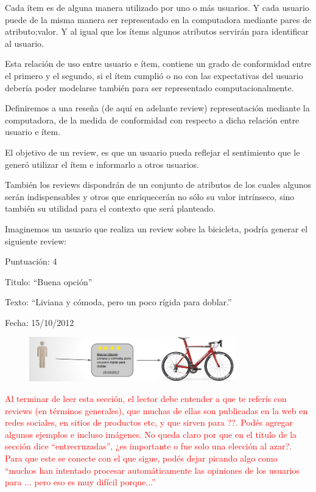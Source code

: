 Cada ítem es de alguna manera utilizado por uno o más usuarios. Y cada usuario puede de la misma manera ser representado en la computadora mediante pares de atributo;valor. Y al igual que los ítems algunos atributos servirán para identificar al usuario. 

Esta relación de uso entre usuario e ítem, contiene un grado de conformidad entre el primero y el segundo, si el ítem cumplió o no con las expectativas del usuario debería poder modelarse también para ser representado computacionalmente.

Definiremos a una reseña (de aquí en adelante review) representación mediante la computadora, de la medida de conformidad con respecto a dicha relación entre usuario e ítem. 

El objetivo de un review, es que un usuario pueda reflejar el sentimiento que le generó utilizar el ítem e informarlo a otros usuarios. 

También los reviews dispondrán de un conjunto de atributos de los cuales algunos serán indispensables y otros que enriquecerán no sólo su valor intrínseco, sino también su utilidad para el contexto que será planteado.

Imaginemos un usuario que realiza un review sobre la bicicleta, podría generar el siguiente review:

Puntuación: 4 

Titulo: ``Buena opción''

Texto: ``Liviana y cómoda, pero un poco rígida para doblar.''

Fecha: 15/10/2012

\begin{figure}
    \centering
    \includegraphics[width=0.8\textwidth,natwidth=610,natheight=642]{biciReview.png}
\end{figure}
\begin{framed}
\textcolor{red}{Al terminar de leer esta sección, el lector debe entender a que te referís con reviews (en términos generales), que muchas de ellas son publicadas en la web en redes sociales, en sitios de productos etc, y que sirven para ??. Podés agregar algunos ejemplos e incluso imágenes. No queda claro por que en el titulo de la sección dice ``entrecruzadas'', ¿es importante o fue solo una elección al azar?. Para que este se conecte con el que sigue, podés dejar picando algo como ``muchos han intentado procesar automáticamente las opiniones de los usuarios para ... pero eso es muy difícil porque...'' }
\end{framed}



